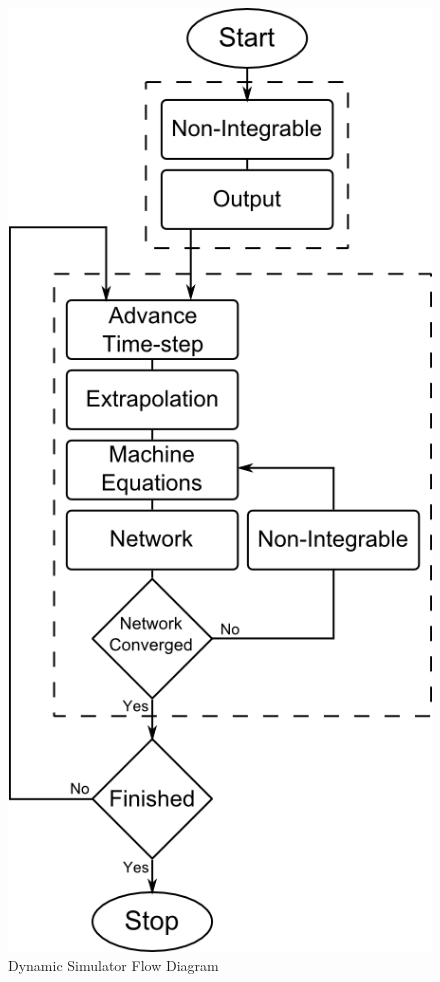 \documentclass[a4paper,oneside,12pt]{report}
\begin{document}
  \begin{figure}
    \begin{center}
      \includegraphics[scale=0.7]{simulatorflow.png}
      \caption{Dynamic Simulator Flow Diagram}
      \label{SimulatorFlow}
    \end{center}
  \end{figure}
\end{document}
